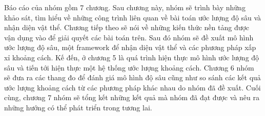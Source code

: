 \begin{comment}
Sau đây là những công việc cụ thể mà nhóm đề ra nhằm hoàn thành đề tài.
\begin{itemize}
	\item Phân tích đề tài: Nhằm hiện thực được các bài toán đề ra. Nhóm cần tìm hiểu và sau đó làm chủ những kiến thức nền tảng và kĩ thuật liên quan mà đang được sử dụng hiện nay.
	\item Dữ liệu: Ở giai đoạn ước lượng độ sâu (depth estimation) bọn em dùng kĩ thuật học sâu, nên điều tối quan trọng ở giai đoạn này là cần có tập dữ liệu (data set) để huấn luyện mô hình. Nhóm sẽ tìm kiếm và chọn ra những tập dữ liệu phù hợp để khi kết thúc quá trình huấn luyện, mô hình cho ra những kết quả tiên đoán như mong muốn.
	\item Chọn lựa và hiện thực mô hình: Nhóm sẽ tiến hành khảo sát các công trình liên quan.
  Đánh giá, so sánh ưu và nhược điểm của các mô hình đồng thời xem xét năng lực của nhóm cũng như tài nguyên hiện có để chọn ra và hiện thực lại mô hình.
   \item Đánh giá mô hình: 
   Nhóm sẽ tìm hiểu những thước đo phổ biến mà các nhóm nghiên cứu dùng để xem xét chất lượng của kết quả mà mô hình tạo ra. 
   \item  Tiến hành ước lượng khoảng cách và so sánh kết quả của những phương pháp : Bước vào giai đoạn sau nhóm sẽ chọn ra một framework để nhận diện vật thể
   cùng với kết quả có được ở giải đoạn đầu nhóm sẽ tiến hành ước lượng khoảng cách của những vật thể nhận diện được thông qua những phương pháp ước lượng do nhóm đề xuất. Cuối cùng nhóm sẽ tiến hành so sánh những kết quả đó và nhau và đưa ra được độ tin cậy của chúng.
   
\end{itemize}
\end{comment}



Báo cáo của nhóm gồm 7 chương. Sau chương này, nhóm sẽ trình bày những khảo sát, tìm hiểu về những công trình liên quan về  bài toán ước lượng độ sâu và nhận diện vật thể. Chương tiếp theo sẽ nói về những kiến thức nền tảng được vận dụng vào để giải quyết các bài toán trên. Sau đó nhóm sẽ đề xuất mô hình ước lượng độ sâu, một framework để nhận diện vật thể và các phương pháp xấp xỉ khoảng cách. Kế đến, ở chương 5 là quá trình hiện thực mô hình ước lượng độ sâu và tiến tới hiện thực một hệ thống ước lượng khoảng cách. Chương 6 nhóm sẽ đưa ra các thang đo để đánh giá mô hình độ sâu cũng như so sánh các kết quả ước lượng khoảng cách từ các phương pháp khác nhau do nhóm đã đề xuất. Cuối cùng, chương 7 nhóm sẽ tổng kết những kết quả mà nhóm đã đạt được và nêu ra những hướng có thể phát triển trong tương lai.

